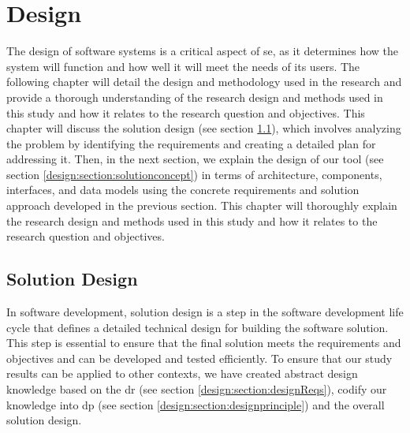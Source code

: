 
\chapter{Design}

\ifpdf
    \graphicspath{{Chapters/Design/Figs/}{Chapters/Design/Figs/}{Chapters/Design/Figs/}}
\else
    \graphicspath{{Chapters/Design/Figs/}{Chapters/Design/Figs/}}
\fi
The design of software systems is a critical aspect of \ac{se}, as it determines how the system will function and how well it will meet the needs of its users.
The following chapter will detail the design and methodology used in the research and provide a thorough understanding of the research design and methods used in this study and how it relates to the research question and objectives.
This chapter will discuss the solution design (see section \ref{design:section:soldesign}), which involves analyzing the problem by identifying the requirements and creating a detailed plan for addressing it.
Then, in the next section, we explain the design of our tool (see section \ref{design:section:solutionconcept}) in terms of architecture, components, interfaces, and data models using the concrete requirements and solution approach developed in the previous section. 
This chapter will thoroughly explain the research design and methods used in this study and how it relates to the research question and objectives.
\section{Solution Design}
\label{design:section:soldesign}
In software development, solution design is a step in the software development life cycle that defines a detailed technical design for building the software solution.
This step is essential to ensure that the final solution meets the requirements and objectives and can be developed and tested efficiently.
To ensure that our study results can be applied to other contexts, we have created abstract design knowledge based on the \ac{dr} (see section \ref{design:section:designReqs}), codify our knowledge into \ac{dp} (see section \ref{design:section:designprinciple}) and the overall solution design.
